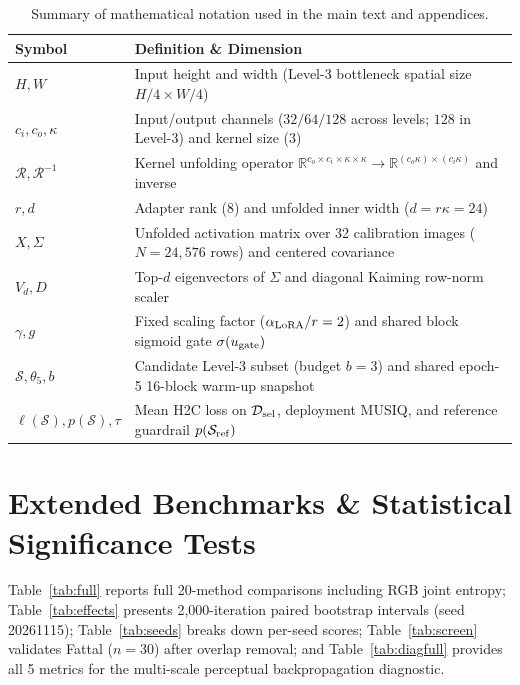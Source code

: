 \documentclass[10pt,twocolumn,letterpaper]{article}
\begin{document}
\begin{table}[H]\centering\small
\begin{tabular*}{0.92\textwidth}{@{\extracolsep{\fill}}ll@{}}\toprule
Symbol & Definition \& Dimension \\\midrule
$H,W$ & Input height and width (Level-3 bottleneck spatial size $H/4\times W/4$) \\
$c_i,c_o,\kappa$ & Input/output channels ($32/64/128$ across levels; $128$ in Level-3) and kernel size ($3$) \\
$\mathcal{R},\mathcal{R}^{-1}$ & Kernel unfolding operator $\mathbb{R}^{c_o\times c_i\times\kappa\times\kappa}\to\mathbb{R}^{(c_o\kappa)\times(c_i\kappa)}$ and inverse \\
$r,d$ & Adapter rank ($8$) and unfolded inner width ($d=r\kappa=24$) \\
$X,\Sigma$ & Unfolded activation matrix over 32 calibration images ($N=24{,}576$ rows) and centered covariance \\
$V_d,D$ & Top-$d$ eigenvectors of $\Sigma$ and diagonal Kaiming row-norm scaler \\
$\gamma,g$ & Fixed scaling factor ($\alpha_{\rm LoRA}/r=2$) and shared block sigmoid gate $\sigma(u_{\rm gate})$ \\
$\mathcal{S},\theta_5,b$ & Candidate Level-3 subset (budget $b=3$) and shared epoch-5 16-block warm-up snapshot \\
$\ell(\mathcal{S}),p(\mathcal{S}),\tau$ & Mean H2C loss on $\mathcal{D}_{\rm sel}$, deployment MUSIQ, and reference guardrail $p(\mathcal{S}_{\rm ref})$ \\\bottomrule
\end{tabular*}
\caption{Summary of mathematical notation used in the main text and appendices.}
\label{tab:symbols}
\end{table}

\clearpage
\section{Extended Benchmarks \& Statistical Significance Tests}
Table~\ref{tab:full} reports full 20-method comparisons including RGB joint entropy; Table~\ref{tab:effects} presents 2,000-iteration paired bootstrap intervals (seed 20261115); Table~\ref{tab:seeds} breaks down per-seed scores; Table~\ref{tab:screen} validates Fattal ($n=30$) after overlap removal; and Table~\ref{tab:diagfull} provides all 5 metrics for the multi-scale perceptual backpropagation diagnostic.

\begin{table}[H]\centering\small\setlength{\tabcolsep}{2.5pt}

\caption{Complete 20-method benchmark on RTTS ($n=4322$) and Fattal ($n=31$) including RGB joint entropy. $\dagger$ from~\cite{bilalora2026}; bottom two rows show 3-seed means. : best; : second best.}
\label{tab:full}
\end{table}
\end{document}
